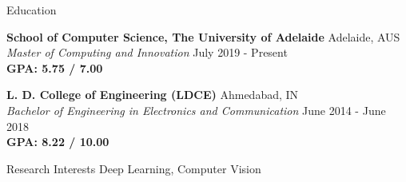 \documentclass{resume}
\begin{document}
\begin{rSection}{Education}

{\bf School of Computer Science, The University of Adelaide} \hfill {Adelaide, AUS}
\\ 
\textit{Master of Computing and Innovation} \hfill {July 2019 - Present} \\
{\bf GPA: 5.75 / 7.00}

{\bf L. D. College of Engineering (LDCE)} \hfill {Ahmedabad, IN}
\\ 
\textit{Bachelor of Engineering in Electronics and Communication } \hfill {June 2014 - June 2018} \\
{\bf GPA: 8.22 / 10.00}

\end{rSection}
\begin{rSection}{Research Interests}
Deep Learning, Computer Vision
\end{rSection}
\end{document}
